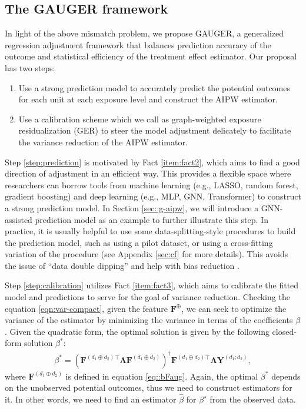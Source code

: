 \documentclass{article}
\theoremstyle{plain}
\theoremstyle{definition}
\theoremstyle{remark}
\newcommand{\bY}{\boldsymbol{Y}}
\newcommand{\bF}{\boldsymbol{F}}
\newcommand{\bLambda}{\boldsymbol{\Lambda}}
\newcommand{\bFaug}{\bF^{(d_1\oplus d_2)}}
\begin{document}
\subsection{The GAUGER framework}
In light of the above mismatch problem, we propose GAUGER, a generalized regression adjustment framework that balances prediction accuracy of the outcome and statistical efficiency of the treatment effect estimator. Our proposal has two steps:
\begin{enumerate}[label=(S\arabic*)]   
    \item\label{step:prediction} Use a strong prediction model to accurately predict the potential outcomes for each unit at each exposure level and construct the AIPW estimator.
    \item\label{step:calibration} Use a calibration scheme which we call as graph-weighted exposure residualization (GER) to steer the model adjustment delicately to facilitate the variance reduction of the AIPW estimator.
\end{enumerate}
Step \ref{step:prediction} is motivated by Fact \ref{item:fact2}, which aims to find a good direction of adjustment in an efficient way. This provides a flexible space where researchers can borrow tools from machine learning (e.g., LASSO, random forest, gradient boosting) and deep learning (e.g., MLP, GNN, Transformer) to construct a strong prediction model. In Section \ref{sec::g-aipw}, we will introduce a GNN-assisted prediction model as an example to further illustrate this step. In practice, it is usually helpful to use some data-splitting-style procedures to build the prediction model, such as using a pilot dataset, or using a cross-fitting variation of the procedure (see Appendix \ref{sec:cf} for more details). This avoids the issue of ``data double dipping'' and help with bias reduction \citep{lu2025conditional}. %

Step \ref{step:calibration} utilizes Fact \ref{item:fact3}, which aims to calibrate the fitted model and predictions to serve for the goal of variance reduction. Checking the equation \eqref{eqn:var-compact}, given the feature $\bF^\oplus$, we can seek to optimize the variance of the estimator by minimizing the variance in terms of the coefficients $\beta$. Given the quadratic form, the optimal solution is given by the following closed-form solution $\beta^{*}$: 
\begin{align}\label{eq::beta-star}
    \beta^{*}  
    = (\bFaug{}^{\top}\bLambda\bFaug)^{\dagger}\bFaug{}^{\top}\bLambda\bY^{(d_1;d_2)},
\end{align}
where $\bFaug$ is defined in equation \eqref{eq::bFaug}. Again, the optimal $\beta^{*}$ depends on the unobserved potential outcomes, thus we need to construct estimators for it. In other words, we need to find an estimator $\hat\beta$ for $\beta^\star$ from the observed data. 
\end{document}
